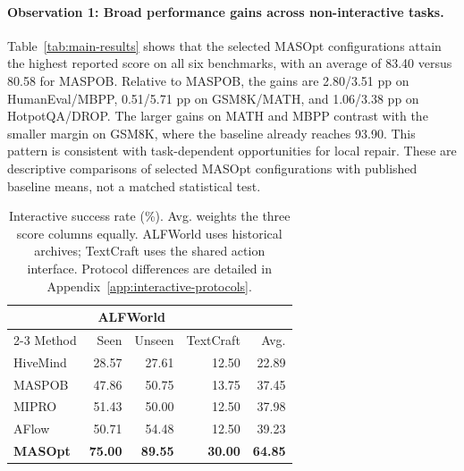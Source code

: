 \paragraph{Observation 1: Broad performance gains across non-interactive tasks.}
Table~\ref{tab:main-results} shows that the selected MASOpt configurations attain the highest reported score on all six benchmarks, with an average of 83.40 versus 80.58 for MASPOB. Relative to MASPOB, the gains are 2.80/3.51 pp on HumanEval/MBPP, 0.51/5.71 pp on GSM8K/MATH, and 1.06/3.38 pp on HotpotQA/DROP. The larger gains on MATH and MBPP contrast with the smaller margin on GSM8K, where the baseline already reaches 93.90. This pattern is consistent with task-dependent opportunities for local repair. These are descriptive comparisons of selected MASOpt configurations with published baseline means, not a matched statistical test.

\begin{table}
    \vspace{-\intextsep}
    \centering
    \caption{Interactive success rate (\%). Avg. weights the three score columns equally. ALFWorld uses historical archives; TextCraft uses the shared action interface. Protocol differences are detailed in Appendix~\ref{app:interactive-protocols}.}
    \label{tab:interactive-results}
    \small
    \setlength{\tabcolsep}{2.3pt}
    \renewcommand{\arraystretch}{1.04}
    \begin{tabular*}{\linewidth}{@{\extracolsep{\fill}}lrrrr@{}}
        \toprule
        & \multicolumn{2}{c}{ALFWorld} & & \\
        \cmidrule(lr){2-3}
        Method & Seen & Unseen & TextCraft & Avg. \\
        \midrule
        HiveMind & 28.57 & 27.61 & 12.50 & 22.89 \\
        MASPOB & 47.86 & 50.75 & 13.75 & 37.45 \\
        MIPRO & 51.43 & 50.00 & 12.50 & 37.98 \\
        AFlow & 50.71 & 54.48 & 12.50 & 39.23 \\
        \midrule
        \textbf{MASOpt} & \textbf{75.00} & \textbf{89.55} & \textbf{30.00} & \textbf{64.85} \\
        \bottomrule
    \end{tabular*}
    \vspace{-0.5\baselineskip}
\end{table}

